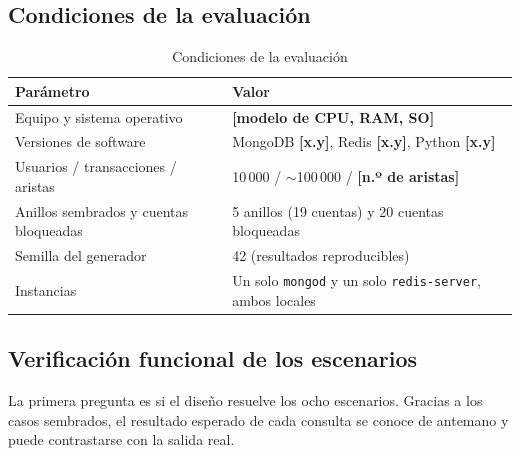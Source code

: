 \documentclass[11pt,a4paper]{article}
\newcommand{\med}[1]{\textcolor{red!70!black}{\textbf{[#1]}}}
\begin{document}
	\subsection{Condiciones de la evaluación}
	\begin{table}[H]
		\centering
		\caption{Condiciones de la evaluación}
		\small
		\begin{tabularx}{\textwidth}{>{\raggedright\arraybackslash}p{5cm}Y}
			\toprule
			\textbf{Parámetro} & \textbf{Valor} \\
			\midrule
			Equipo y sistema operativo & \med{modelo de CPU, RAM, SO} \\
			Versiones de software & MongoDB \med{x.y}, Redis \med{x.y}, Python \med{x.y} \\
			Usuarios / transacciones / aristas & 10\,000 / $\sim$100\,000 / \med{n.º de aristas} \\
			Anillos sembrados y cuentas bloqueadas & 5 anillos (19 cuentas) y 20 cuentas bloqueadas \\
			Semilla del generador & 42 (resultados reproducibles) \\
			Instancias & Un solo \texttt{mongod} y un solo \texttt{redis-server}, ambos locales \\
			\bottomrule
		\end{tabularx}
	\end{table}
	
	\subsection{Verificación funcional de los escenarios}
	La primera pregunta es si el diseño resuelve los ocho escenarios. Gracias a los casos sembrados, el resultado esperado de cada consulta se conoce de antemano y puede contrastarse con la salida real.
	
\end{document}
